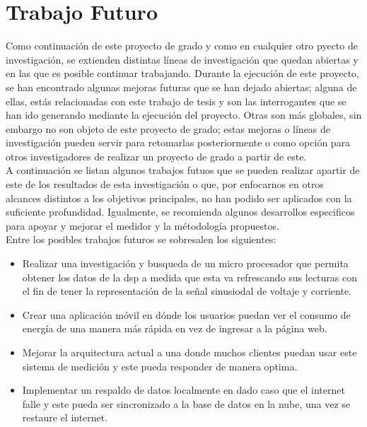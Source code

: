 \begin{itemize}
\end{itemize}
\chapter{ Trabajo Futuro}
Como continuación de este proyecto de grado y como en cualquier otro pyecto de investigación, se extienden distintas líneas de investigación que quedan abiertas y en las que es posible continuar trabajando. Durante la ejecución de este proyecto, se han encontrado algunas mejoras futuras que se han dejado abiertas; alguna de ellas, estás relacionadas con este trabajo de tesis y son las interrogantes que se han ido generando mediante la ejecución del proyecto. Otras son más globales, sin embargo no son objeto de este proyecto de grado; estas mejoras o líneas de investigación pueden servir para retomarlas posteriormente o como opción para otros investigadores de realizar un proyecto de grado a partir de este. \\

A continuación se listan algunos trabajos futuos que se pueden realizar apartir de este de los resultados de esta investigación o que, por enfocarnos en otros alcances distintos a los objetivos principales, no han podido ser aplicados con la suficiente profundidad. Igualmente, se recomienda algunos desarrollos especificos para apoyar y mejorar el medidor y la métodología propuestos. \\
Entre los posibles trabajos futuros se sobresalen los siguientes:

\begin{itemize}
    \itemsep0em
    \item Realizar una investigación y busqueda de un micro procesador que permita obtener los datos de la dsp a medida que esta va refrescando sus lecturas con el fin de tener la representación de la señal sinusiodal de voltaje y corriente.
    \item Crear una aplicación móvil en dónde los usuarios puedan ver el consumo de energía de una manera más rápida en vez de ingresar a la página web.
    \item Mejorar la arquitectura actual a una donde muchos clientes puedan usar este sistema de medición y este pueda responder de manera optima.
    \item Implementar un respaldo de datos localmente en dado caso que el internet falle y este pueda ser sincronizado a la base de datos en la nube, una vez se restaure el internet.
\end{itemize}